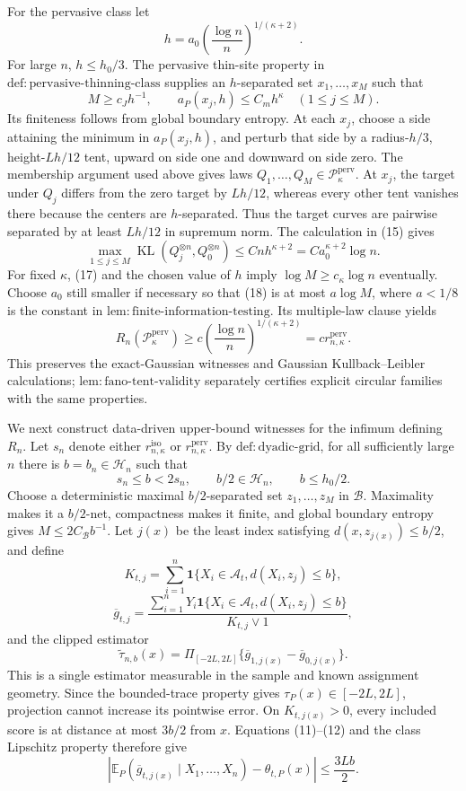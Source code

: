 For the pervasive class let
\[
 h=a_0\left(\frac{\log n}{n}\right)^{1/(\kappa+2)}.
\]
For large \(n\), \(h\le h_0/3\).  The pervasive thin-site property in \(\mathrm{def:pervasive\text{-}thinning\text{-}class}\) supplies an \(h\)-separated set \(x_1,\ldots,x_M\) such that
\[
 M\ge c_Jh^{-1},
 \qquad a_P(x_j,h)\le C_mh^{\kappa}\quad(1\le j\le M). \tag{17}
\]
Its finiteness follows from global boundary entropy.  At each \(x_j\), choose a side attaining the minimum in \(a_P(x_j,h)\), and perturb that side by a radius-\(h/3\), height-\(Lh/12\) tent, upward on side one and downward on side zero.  The membership argument used above gives laws \(Q_1,\ldots,Q_M\in\mathcal P_{\kappa}^{\mathrm{perv}}\).  At \(x_j\), the target under \(Q_j\) differs from the zero target by \(Lh/12\), whereas every other tent vanishes there because the centers are \(h\)-separated.  Thus the target curves are pairwise separated by at least \(Lh/12\) in supremum norm.  The calculation in (15) gives
\[
 \max_{1\le j\le M}
 \operatorname{KL}(Q_j^{\otimes n},Q_0^{\otimes n})
 \le Cnh^{\kappa+2}
 =Ca_0^{\kappa+2}\log n. \tag{18}
\]
For fixed \(\kappa\), (17) and the chosen value of \(h\) imply \(\log M\ge c_{\kappa}\log n\) eventually.  Choose \(a_0\) still smaller if necessary so that (18) is at most \(a\log M\), where \(a<1/8\) is the constant in \(\mathrm{lem:finite\text{-}information\text{-}testing}\).  Its multiple-law clause yields
\[
 R_n(\mathcal P_{\kappa}^{\mathrm{perv}})
 \ge c\left(\frac{\log n}{n}\right)^{1/(\kappa+2)}
 =c r_{n,\kappa}^{\mathrm{perv}}. \tag{19}
\]
This preserves the exact-Gaussian witnesses and Gaussian Kullback--Leibler calculations; \(\mathrm{lem:fano\text{-}tent\text{-}validity}\) separately certifies explicit circular families with the same properties.

We next construct data-driven upper-bound witnesses for the infimum defining \(R_n\).  Let \(s_n\) denote either \(r_{n,\kappa}^{\mathrm{iso}}\) or \(r_{n,\kappa}^{\mathrm{perv}}\).  By \(\mathrm{def:dyadic\text{-}grid}\), for all sufficiently large \(n\) there is \(b=b_n\in\mathcal H_n\) such that
\[
 s_n\le b<2s_n,
 \qquad b/2\in\mathcal H_n,
 \qquad b\le h_0/2. \tag{20}
\]
Choose a deterministic maximal \(b/2\)-separated set \(z_1,\ldots,z_M\) in \(\mathcal B\).  Maximality makes it a \(b/2\)-net, compactness makes it finite, and global boundary entropy gives \(M\le2C_{\mathcal B}b^{-1}\).  Let \(j(x)\) be the least index satisfying \(d(x,z_{j(x)})\le b/2\), and define
\[
 K_{t,j}=\sum_{i=1}^n
 \mathbf1\{X_i\in\mathcal A_t, d(X_i,z_j)\le b\},
\]
\[
 \overline g_{t,j}
 =\frac{\sum_{i=1}^nY_i
 \mathbf1\{X_i\in\mathcal A_t, d(X_i,z_j)\le b\}}
 {K_{t,j}\vee1},
\]
and the clipped estimator
\[
 \widetilde\tau_{n,b}(x)
 =\Pi_{[-2L,2L]}\{\overline g_{1,j(x)}-\overline g_{0,j(x)}\}.
 \tag{21}
\]
This is a single estimator measurable in the sample and known assignment geometry.  Since the bounded-trace property gives \(\tau_P(x)\in[-2L,2L]\), projection cannot increase its pointwise error.  On \(K_{t,j(x)}>0\), every included score is at distance at most \(3b/2\) from \(x\).  Equations (11)--(12) and the class Lipschitz property therefore give
\[
 \left|\mathbb E_P(\overline g_{t,j(x)}\mid X_1,\ldots,X_n)
       -\theta_{t,P}(x)\right|
 \le\frac{3Lb}{2}. \tag{22}
\]


